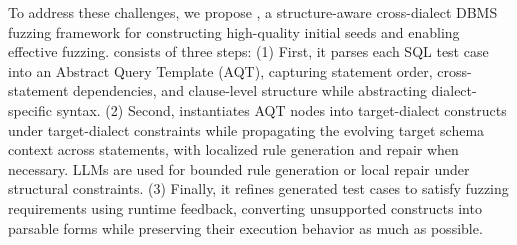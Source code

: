 \documentclass[conference]{IEEEtran}
\begin{document}
To address these challenges, we propose \tool{}, a structure-aware cross-dialect DBMS fuzzing framework for constructing high-quality initial seeds and enabling effective fuzzing.
\tool{} consists of three steps:
(1) First, it parses each SQL test case into an Abstract Query Template (AQT), capturing statement order, cross-statement dependencies, and clause-level structure while abstracting dialect-specific syntax.
(2) Second, \tool{} instantiates AQT nodes into target-dialect constructs under target-dialect constraints while propagating the evolving target schema context across statements, with localized rule generation and repair when necessary.
LLMs are used for bounded rule generation or local repair under structural constraints.
(3) Finally, it refines generated test cases to satisfy fuzzing requirements using runtime feedback, converting unsupported constructs into parsable forms while preserving their execution behavior as much as possible.
\end{document}
